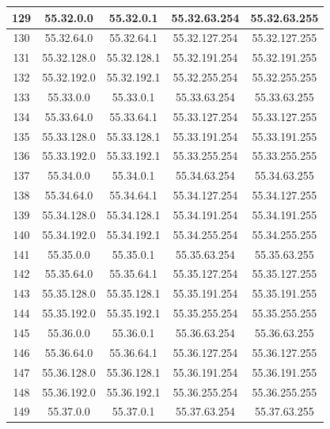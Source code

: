 \documentclass[letterpaper,12pt]{article}
\begin{document}
\begin{center}
\begin{longtable}{|c|c|c|c|c|}
                129 & 55.32.0.0 & 55.32.0.1 & 55.32.63.254 & 55.32.63.255 \\ \hline
                130 & 55.32.64.0 & 55.32.64.1 & 55.32.127.254 & 55.32.127.255 \\ \hline
                131 & 55.32.128.0 & 55.32.128.1 & 55.32.191.254 & 55.32.191.255 \\ \hline
                132 & 55.32.192.0 & 55.32.192.1 & 55.32.255.254 & 55.32.255.255 \\ \hline
                133 & 55.33.0.0 & 55.33.0.1 & 55.33.63.254 & 55.33.63.255 \\ \hline
                134 & 55.33.64.0 & 55.33.64.1 & 55.33.127.254 & 55.33.127.255 \\ \hline
                135 & 55.33.128.0 & 55.33.128.1 & 55.33.191.254 & 55.33.191.255 \\ \hline
                136 & 55.33.192.0 & 55.33.192.1 & 55.33.255.254 & 55.33.255.255 \\ \hline
                137 & 55.34.0.0 & 55.34.0.1 & 55.34.63.254 & 55.34.63.255 \\ \hline
                138 & 55.34.64.0 & 55.34.64.1 & 55.34.127.254 & 55.34.127.255 \\ \hline
                139 & 55.34.128.0 & 55.34.128.1 & 55.34.191.254 & 55.34.191.255 \\ \hline
                140 & 55.34.192.0 & 55.34.192.1 & 55.34.255.254 & 55.34.255.255 \\ \hline
                141 & 55.35.0.0 & 55.35.0.1 & 55.35.63.254 & 55.35.63.255 \\ \hline
                142 & 55.35.64.0 & 55.35.64.1 & 55.35.127.254 & 55.35.127.255 \\ \hline
                143 & 55.35.128.0 & 55.35.128.1 & 55.35.191.254 & 55.35.191.255 \\ \hline
                144 & 55.35.192.0 & 55.35.192.1 & 55.35.255.254 & 55.35.255.255 \\ \hline
                145 & 55.36.0.0 & 55.36.0.1 & 55.36.63.254 & 55.36.63.255 \\ \hline
                146 & 55.36.64.0 & 55.36.64.1 & 55.36.127.254 & 55.36.127.255 \\ \hline
                147 & 55.36.128.0 & 55.36.128.1 & 55.36.191.254 & 55.36.191.255 \\ \hline
                148 & 55.36.192.0 & 55.36.192.1 & 55.36.255.254 & 55.36.255.255 \\ \hline
                149 & 55.37.0.0 & 55.37.0.1 & 55.37.63.254 & 55.37.63.255 \\ \hline

\end{longtable}
\end{center}
\end{document}
